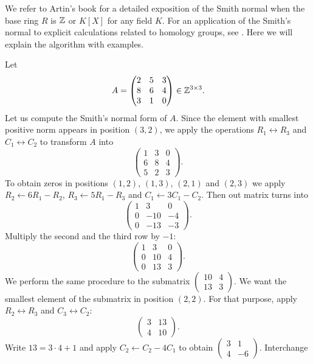 We refer to Artin's book \cite[\S14]{MR1129886} for 
a detailed exposition of the Smith normal
when the base ring $R$ is $\mathbb{Z}$ or
$K[X]$ for any field $K$. For an application 
of the Smith's normal to explicit calculations related to 
homology groups, see \cite[\S11]{MR755006}. 
Here we will explain the algorithm with examples. 

\begin{example}
Let 
\[
A=\begin{pmatrix}
	2 & 5 & 3\\
	8 & 6 & 4\\
	3 & 1 & 0
\end{pmatrix}\in\mathbb{Z}^{3\times3}.
\]	
Let us compute the Smith's normal form of $A$.
Since the element with smallest positive norm appears in position $(3,2)$,
we apply the operations $R_1\leftrightarrow R_3$ and 
$C_1\leftrightarrow C_2$ to transform $A$ into 
\[
\begin{pmatrix}
	1 & 3 & 0\\
	6 & 8 & 4\\
	5 & 2 & 3
\end{pmatrix}.
\]
To obtain zeros in positions $(1,2)$, $(1,3)$, $(2,1)$ and $(2,3)$ we 
apply 
$R_2\leftarrow 6R_1-R_2$, $R_3\leftarrow 5R_1-R_3$ and 
$C_1\leftarrow 3C_1-C_2$. Then out matrix turns into   
\[
\begin{pmatrix}
	1 & 3 & 0\\
	0 & -10 & -4\\
	0 & -13 & -3
\end{pmatrix}.
\]
Multiply the second and the third row 
by $-1$:
\[
\begin{pmatrix}
	1 & 3 & 0\\
	0 & 10 & 4\\
	0 & 13 & 3
\end{pmatrix}.
\]
We perform the same procedure to the submatrix $\begin{pmatrix}10&4\\13&3\end{pmatrix}$. 
We want the smallest element of the submatrix in position 
$(2,2)$. For that purpose, apply $R_2\leftrightarrow R_3$ and 
$C_3\leftrightarrow C_2$:
\[ 
\begin{pmatrix}
3 & 13\\
4 & 10
\end{pmatrix}.
\]
Write $13=3\cdot 4+1$ and apply 
$C_2\leftarrow C_2-4C_1$ to obtain $\begin{pmatrix}3&1\\4&-6\end{pmatrix}$. Interchange 

\end{example}
